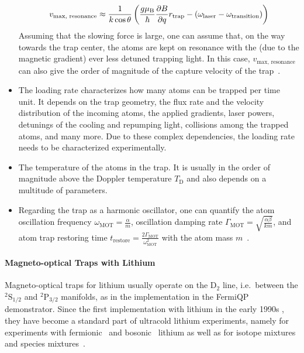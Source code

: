 \begin{itemize}
    \begin{align}\label{eq:resonance_velocity}
        v_\text{max, resonance} \approx \frac{1}{k \cos \theta}
        \left(
            \frac{g \mu_\text{B}}{\hbar} \pdv{B}{q} r_\text{trap} - \left(\omega_\text{laser} - \omega_\text{transition}\right)
        \right)
    \end{align}
    Assuming that the slowing force is large, one can assume that, on the way towards the trap center, the atoms are kept on resonance with the (due to the magnetic gradient) ever less detuned trapping light. In this case, $v_\text{max, resonance}$ can also give the order of magnitude of the capture velocity of the trap~\cite{tiecke_high-flux_2009}.
    \item The loading rate characterizes how many atoms can be trapped per time unit. It depends on the trap geometry, the flux rate and the velocity distribution of the incoming atoms, the applied gradients, laser powers, detunings of the cooling and repumping light, collisions among the trapped atoms, and many more. Due to these complex dependencies, the loading rate needs to be characterized experimentally.
    \item The temperature of the atoms in the trap. It is usually in the order of magnitude above the Doppler temperature $T_\text{D}$ and also depends on a multitude of parameters.
    \item Regarding the trap as a harmonic oscillator, one can quantify the atom oscillation frequency $\omega_\text{MOT} = \frac{\alpha}{m}$, oscillation damping rate $\Gamma_\text{MOT} = \sqrt{\frac{\alpha \beta}{km}}$, and atom trap restoring time $t_\text{restore} = \frac{2\Gamma_\text{MOT}}{\omega_\text{MOT}^2}$ with the atom mass $m$~\cite{metcalf_laser_1999}.
\end{itemize}

\paragraph{Magneto-optical Traps with Lithium}\label{ch:3d_mots_with_li}
Magneto-optical traps for lithium usually operate on the D$_2$ line, i.e.~between the $^2\text{S}_{1/2}$ and $^2\text{P}_{3/2}$ manifolds, as in the implementation in the FermiQP demonstrator. Since the first implementation with lithium in the early 1990s \cite{kawanaka_decay_1993}, they have become a standard part of ultracold lithium experiments, namely for experiments with fermionic~\cite{duarte_all-optical_2011,omran_microscopic_2015} and bosonic~\cite{kawanaka_decay_1993,schunemann_magneto-optic_1998} lithium as well as for isotope mixtures \cite{mewes_simultaneous_1999, schreck_sympathetic_2001, hilker_laser_2012, kerkmann_novel_2019} and species mixtures~\cite{ladouceur_compact_2009,tiecke_high-flux_2009,chen_lithium-cesium_2021}.


